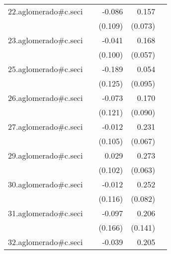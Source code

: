 {\begin{longtable}{l*{4}{D{.}{.}{-1}}}
\addlinespace
22.aglomerado#c.seci&                     &      -0.086         &       0.157\sym{*}  &                     \\
            &                     &     (0.109)         &     (0.073)         &                     \\
\addlinespace
23.aglomerado#c.seci&                     &      -0.041         &       0.168\sym{**} &                     \\
            &                     &     (0.100)         &     (0.057)         &                     \\
\addlinespace
25.aglomerado#c.seci&                     &      -0.189         &       0.054         &                     \\
            &                     &     (0.125)         &     (0.095)         &                     \\
\addlinespace
26.aglomerado#c.seci&                     &      -0.073         &       0.170         &                     \\
            &                     &     (0.121)         &     (0.090)         &                     \\
\addlinespace
27.aglomerado#c.seci&                     &      -0.012         &       0.231\sym{***}&                     \\
            &                     &     (0.105)         &     (0.067)         &                     \\
\addlinespace
29.aglomerado#c.seci&                     &       0.029         &       0.273\sym{***}&                     \\
            &                     &     (0.102)         &     (0.063)         &                     \\
\addlinespace
30.aglomerado#c.seci&                     &      -0.012         &       0.252\sym{**} &                     \\
            &                     &     (0.116)         &     (0.082)         &                     \\
\addlinespace
31.aglomerado#c.seci&                     &      -0.097         &       0.206         &                     \\
            &                     &     (0.166)         &     (0.141)         &                     \\
\addlinespace
32.aglomerado#c.seci&                     &      -0.039         &       0.205\sym{*}  &                     \\

\end{longtable}}
